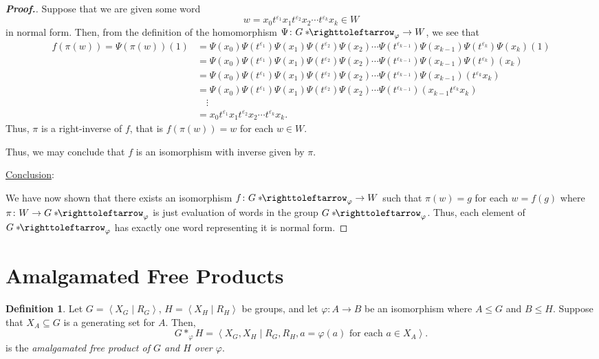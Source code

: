 \documentclass[11pt,a4paper,reqno]{amsart}
\theoremstyle{plain}
\theoremstyle{definition}
\newtheorem{definition}[theorem]{Definition}
\theoremstyle{definition}
\renewcommand\leq\leqslant
\newenvironment{myproof}{\begin{proof}[\normalfont\bfseries Proof.]}{\end{proof}}
\newcommand\hnn{*\!\!\righttoleftarrow}
\begin{document}
\begin{myproof}
	Suppose that we are given some word
	\[
		w = x_0 t^{\varepsilon_1} x_1 t^{\varepsilon_2} x_2 \cdots t^{\varepsilon_k} x_k \in W
	\]
	in normal form. Then, from the definition of the homomorphism $\Psi\colon G\hnn_\varphi\to W$, we see that
	\begin{align*}
		f(\pi(w))=
		\Psi(\pi(w))(1)
		 & =
		\Psi(x_0) \Psi(t^{\varepsilon_1})\Psi(x_1)
		\Psi(t^{\varepsilon_2})\Psi(x_2)
		\cdots
		\Psi(t^{\varepsilon_{k-1}})\Psi(x_{k-1})
		\Psi(t^{\varepsilon_k})\Psi(x_k)(1)
		\\
		 & =
		\Psi(x_0) \Psi(t^{\varepsilon_1})\Psi(x_1)
		\Psi(t^{\varepsilon_2})\Psi(x_2)
		\cdots
		\Psi(t^{\varepsilon_{k-1}})\Psi(x_{k-1})
		\Psi(t^{\varepsilon_k})(x_k)
		\\
		 & =
		\Psi(x_0) \Psi(t^{\varepsilon_1})\Psi(x_1)
		\Psi(t^{\varepsilon_2})\Psi(x_2)
		\cdots
		\Psi(t^{\varepsilon_{k-1}})\Psi(x_{k-1})
		(t^{\varepsilon_k}x_k)
		\\
		 & =
		\Psi(x_0) \Psi(t^{\varepsilon_1})\Psi(x_1)
		\Psi(t^{\varepsilon_2})\Psi(x_2)
		\cdots
		\Psi(t^{\varepsilon_{k-1}})(x_{k-1}t^{\varepsilon_k}x_k)
		\\
		 & \quad\vdots
		\\
		 & =
		x_0 t^{\varepsilon_1} x_1 t^{\varepsilon_2} x_2 \cdots t^{\varepsilon_k} x_k.
	\end{align*}
	Thus, $\pi$ is a right-inverse of $f$, that is $f(\pi(w)) = w$ for each $w\in W$.

	Thus, we may conclude that $f$ is an isomorphism with inverse given by $\pi$.

	\medskip
	\noindent
	\underline{Conclusion}:

	\smallskip
	\noindent
	We have now shown that there exists an isomorphism $f\colon G\hnn_\varphi \to W$ such that $\pi(w)=g$ for each $w=f(g)$ where $\pi\colon W\to G\hnn_\varphi$ is just evaluation of words in the group $G\hnn_\varphi$.
	Thus, each element of $G\hnn_\varphi$ has exactly one word representing it is normal form.
\end{myproof}

\section{Amalgamated Free Products}

\begin{definition}\label{def:amalgamated}
	Let $G = \left\langle X_G\mid R_G \right\rangle$, $H = \left\langle X_H \mid R_H\right\rangle$ be groups,
	and let $\varphi\colon A\to B$ be an isomorphism where $A\leq G$ and $B\leq H$.
	Suppose that $X_A\subseteq G$ is a generating set for $A$.
	Then,
	\[
		G*_\varphi H
		=
		\left\langle X_G, X_H
		\mid
		R_G, R_H, a = \varphi(a)\text{ for each }a\in X_A
		\right\rangle.
	\]
	is the \emph{amalgamated free product of $G$ and $H$ over $\varphi$}.
\end{definition}
\end{document}
